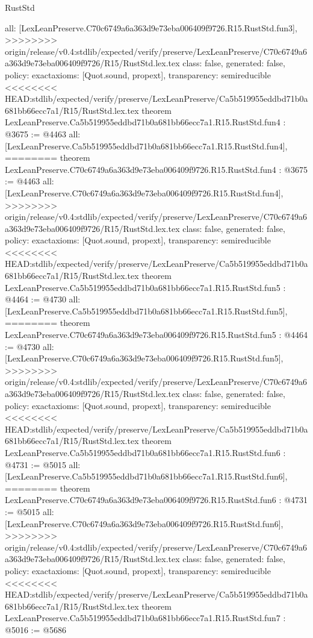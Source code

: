 \begin{lexlean}{RustStd}
\begin{coremodule}
{\begin{coremodule}
{{{{{{{  all: [LexLeanPreserve.C70c6749a6a363d9e73eba006409f9726.R15.RustStd.fun3],
>>>>>>>> origin/release/v0.4:stdlib/expected/verify/preserve/LexLeanPreserve/C70c6749a6a363d9e73eba006409f9726/R15/RustStd.lex.tex
  class: false,
  generated: false,
  policy: exact{axioms: [Quot.sound, propext]},
  transparency: semireducible
}
<<<<<<<< HEAD:stdlib/expected/verify/preserve/LexLeanPreserve/Ca5b519955eddbd71b0a681bb66ecc7a1/R15/RustStd.lex.tex
theorem LexLeanPreserve.Ca5b519955eddbd71b0a681bb66ecc7a1.R15.RustStd.fun4 : @3675 := @4463 {
  all: [LexLeanPreserve.Ca5b519955eddbd71b0a681bb66ecc7a1.R15.RustStd.fun4],
========
theorem LexLeanPreserve.C70c6749a6a363d9e73eba006409f9726.R15.RustStd.fun4 : @3675 := @4463 {
  all: [LexLeanPreserve.C70c6749a6a363d9e73eba006409f9726.R15.RustStd.fun4],
>>>>>>>> origin/release/v0.4:stdlib/expected/verify/preserve/LexLeanPreserve/C70c6749a6a363d9e73eba006409f9726/R15/RustStd.lex.tex
  class: false,
  generated: false,
  policy: exact{axioms: [Quot.sound, propext]},
  transparency: semireducible
}
<<<<<<<< HEAD:stdlib/expected/verify/preserve/LexLeanPreserve/Ca5b519955eddbd71b0a681bb66ecc7a1/R15/RustStd.lex.tex
theorem LexLeanPreserve.Ca5b519955eddbd71b0a681bb66ecc7a1.R15.RustStd.fun5 : @4464 := @4730 {
  all: [LexLeanPreserve.Ca5b519955eddbd71b0a681bb66ecc7a1.R15.RustStd.fun5],
========
theorem LexLeanPreserve.C70c6749a6a363d9e73eba006409f9726.R15.RustStd.fun5 : @4464 := @4730 {
  all: [LexLeanPreserve.C70c6749a6a363d9e73eba006409f9726.R15.RustStd.fun5],
>>>>>>>> origin/release/v0.4:stdlib/expected/verify/preserve/LexLeanPreserve/C70c6749a6a363d9e73eba006409f9726/R15/RustStd.lex.tex
  class: false,
  generated: false,
  policy: exact{axioms: [Quot.sound, propext]},
  transparency: semireducible
}
<<<<<<<< HEAD:stdlib/expected/verify/preserve/LexLeanPreserve/Ca5b519955eddbd71b0a681bb66ecc7a1/R15/RustStd.lex.tex
theorem LexLeanPreserve.Ca5b519955eddbd71b0a681bb66ecc7a1.R15.RustStd.fun6 : @4731 := @5015 {
  all: [LexLeanPreserve.Ca5b519955eddbd71b0a681bb66ecc7a1.R15.RustStd.fun6],
========
theorem LexLeanPreserve.C70c6749a6a363d9e73eba006409f9726.R15.RustStd.fun6 : @4731 := @5015 {
  all: [LexLeanPreserve.C70c6749a6a363d9e73eba006409f9726.R15.RustStd.fun6],
>>>>>>>> origin/release/v0.4:stdlib/expected/verify/preserve/LexLeanPreserve/C70c6749a6a363d9e73eba006409f9726/R15/RustStd.lex.tex
  class: false,
  generated: false,
  policy: exact{axioms: [Quot.sound, propext]},
  transparency: semireducible
}
<<<<<<<< HEAD:stdlib/expected/verify/preserve/LexLeanPreserve/Ca5b519955eddbd71b0a681bb66ecc7a1/R15/RustStd.lex.tex
theorem LexLeanPreserve.Ca5b519955eddbd71b0a681bb66ecc7a1.R15.RustStd.fun7 : @5016 := @5686 {
}}}}}}}}}}
\end{coremodule}}
\end{coremodule}
\end{lexlean}
